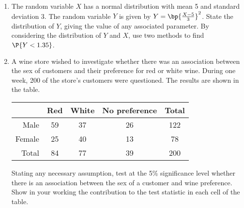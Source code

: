 \begin{problem}
    \begin{enumerate}
        \item The random variable $X$ has a normal distribution with mean 5 and standard deviation 3. The random variable $Y$ is given by $Y = \bp{\frac{X-5}{3}}^2$. State the distribution of $Y$, giving the value of any associated parameter. By considering the distribution of $Y$ and $X$, use two methods to find $\P{Y < 1.35}$.
        \item A wine store wished to investigate whether there was an association between the sex of customers and their preference for red or white wine. During one week, 200 of the store's customers were questioned. The results are shown in the table.
        
        \begin{table}[H]
            \centering
            \begin{tabular}{|r|c|c|c|c|}
            \hline
             & Red & White & No preference & Total \\ \hline
            Male & 59 & 37 & 26 & 122 \\ \hline
            Female & 25 & 40 & 13 & 78 \\ \hline
            Total & 84 & 77 & 39 & 200 \\ \hline
            \end{tabular}
        \end{table}
        
        Stating any necessary assumption, test at the 5\% significance level whether there is an association between the sex of a customer and wine preference. Show in your working the contribution to the test statistic in each cell of the table.
    \end{enumerate}
\end{problem}
